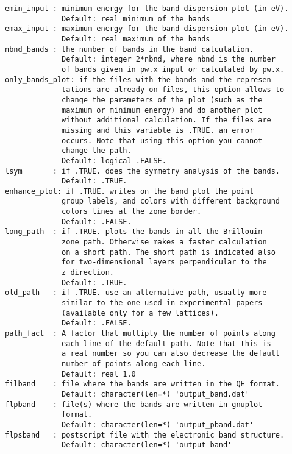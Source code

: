 \documentclass[12pt,a4paper,twoside]{report}
\begin{document}
\begin{verbatim}
emin_input : minimum energy for the band dispersion plot (in eV).
             Default: real minimum of the bands
emax_input : maximum energy for the band dispersion plot (in eV).
             Default: real maximum of the bands
nbnd_bands : the number of bands in the band calculation.
             Default: integer 2*nbnd, where nbnd is the number 
             of bands given in pw.x input or calculated by pw.x.
only_bands_plot: if the files with the bands and the represen-
             tations are already on files, this option allows to 
             change the parameters of the plot (such as the 
             maximum or minimum energy) and do another plot 
             without additional calculation. If the files are
             missing and this variable is .TRUE. an error 
             occurs. Note that using this option you cannot 
             change the path.
             Default: logical .FALSE.
lsym       : if .TRUE. does the symmetry analysis of the bands.
             Default: .TRUE.
enhance_plot: if .TRUE. writes on the band plot the point 
             group labels, and colors with different background 
             colors lines at the zone border.
             Default: .FALSE.
long_path  : if .TRUE. plots the bands in all the Brillouin 
             zone path. Otherwise makes a faster calculation 
             on a short path. The short path is indicated also 
             for two-dimensional layers perpendicular to the 
             z direction.
             Default: .TRUE.
old_path   : if .TRUE. use an alternative path, usually more 
             similar to the one used in experimental papers 
             (available only for a few lattices).
             Default: .FALSE.
path_fact  : A factor that multiply the number of points along 
             each line of the default path. Note that this is 
             a real number so you can also decrease the default 
             number of points along each line.
             Default: real 1.0
filband    : file where the bands are written in the QE format.
             Default: character(len=*) 'output_band.dat'
flpband    : file(s) where the bands are written in gnuplot 
             format.
             Default: character(len=*) 'output_pband.dat'
flpsband   : postscript file with the electronic band structure.
             Default: character(len=*) 'output_band'
\end{verbatim}
\end{document}

